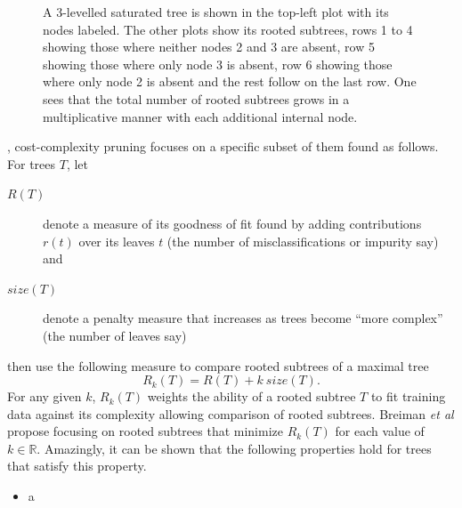 \begin{figure}
\caption{A 3-levelled saturated tree is shown in the top-left plot with its nodes labeled. The other plots show its rooted subtrees, rows 1 to 4 showing those where neither nodes 2 and 3 are absent, row 5 showing those where only node 3 is absent, row 6 showing those where only node 2 is absent and the rest follow on the last row. One sees that the total number of rooted subtrees grows in a multiplicative manner with each additional internal node.}
\label{fig_rooted_subtrees}
\end{figure}, cost-complexity pruning focuses on a specific subset of them found as follows. For trees $T$, let
\begin{description}
\item[$R(T)$] denote a measure of its goodness of fit found by adding contributions $r(t)$ over its leaves $t$ (the number of misclassifications or impurity say) and
\item[$size(T)$] denote a penalty measure that increases as trees become ``more complex'' (the number of leaves say)
\end{description} 
then use the following measure to compare rooted subtrees of a maximal tree $$R_k(T)=R(T)+k~size(T).$$
For any given $k$, $R_k(T)$ weights the ability of a rooted subtree $T$ to fit training data against its complexity allowing comparison of rooted subtrees. Breiman \emph{et al} propose focusing on rooted subtrees that minimize $R_k(T)$ for each value of $k\in\mathbb{R}$. Amazingly, it can be shown that the following properties hold for trees that satisfy this property. 
\begin{itemize}
\item a
\end{itemize}

